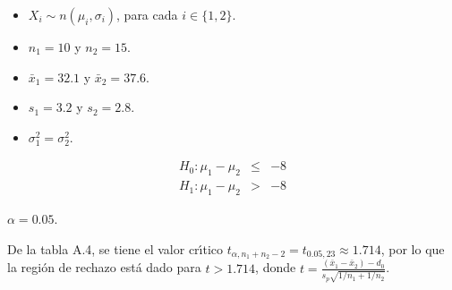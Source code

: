 \begin{solucion}
 $\phantom{0}$
 \begin{datos}
  $\phantom{0}$
  \begin{itemize}
   \item $X_i \sim n\left( \mu_i, \sigma_i \right)$,
   para cada $i \in \{ 1,2 \}$.
   \item $n_1 = 10$ y $n_2 = 15$.
   \item $\bar{x}_1 = 32.1$ y $\bar{x}_2 = 37.6$.
   \item $s_1 = 3.2$ y $s_2 = 2.8$.
   \item $\sigma_1^2 = \sigma_2^2$.
  \end{itemize}
 \end{datos}

 \begin{hipotesis}
  \begin{eqnarray*}
   H_0: \mu_1 - \mu_2 & \leq & -8 \\
   H_1: \mu_1 - \mu_2 &   >  & -8
  \end{eqnarray*}
 \end{hipotesis}

 \begin{significancia}
  $\alpha = 0.05$.
 \end{significancia}

 \begin{region}
  De la tabla A.4, se tiene el valor cr\'{\i}tico
  $t_{\alpha,n_1+n_2-2} = t_{0.05,23} \approx 1.714$,
  por lo que la regi\'on de rechazo est\'a dado para $t > 1.714$,
  donde $t = \frac{
  \left( \bar{x}_1 - \bar{x}_2 \right) - d_0
  }{
  s_p\sqrt{1/n_1 + 1/n_2}
  }$.
 \end{region}


\end{solucion}
